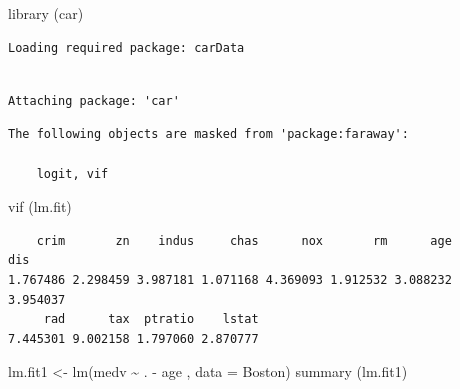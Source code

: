 \documentclass[
  letterpaper,
  DIV=11,
  numbers=noendperiod]{scrartcl}
\newenvironment{Shaded}{\begin{snugshade}}{\end{snugshade}}
\newcommand{\AttributeTok}[1]{\textcolor[rgb]{0.40,0.45,0.13}{#1}}
\newcommand{\FunctionTok}[1]{\textcolor[rgb]{0.28,0.35,0.67}{#1}}
\newcommand{\NormalTok}[1]{\textcolor[rgb]{0.00,0.23,0.31}{#1}}
\newcommand{\OtherTok}[1]{\textcolor[rgb]{0.00,0.23,0.31}{#1}}
\newcommand{\SpecialCharTok}[1]{\textcolor[rgb]{0.37,0.37,0.37}{#1}}
\begin{document}
\begin{Shaded}
\begin{Highlighting}[]
\FunctionTok{library}\NormalTok{ (car)}
\end{Highlighting}
\end{Shaded}

\begin{verbatim}
Loading required package: carData
\end{verbatim}

\begin{verbatim}

Attaching package: 'car'
\end{verbatim}

\begin{verbatim}
The following objects are masked from 'package:faraway':

    logit, vif
\end{verbatim}

\begin{Shaded}
\begin{Highlighting}[]
\FunctionTok{vif}\NormalTok{ (lm.fit)}
\end{Highlighting}
\end{Shaded}

\begin{verbatim}
    crim       zn    indus     chas      nox       rm      age      dis 
1.767486 2.298459 3.987181 1.071168 4.369093 1.912532 3.088232 3.954037 
     rad      tax  ptratio    lstat 
7.445301 9.002158 1.797060 2.870777 
\end{verbatim}

\begin{Shaded}
\begin{Highlighting}[]
\NormalTok{lm.fit1 }\OtherTok{\textless{}{-}} \FunctionTok{lm}\NormalTok{(medv }\SpecialCharTok{\textasciitilde{}}\NormalTok{ . }\SpecialCharTok{{-}}\NormalTok{ age , }\AttributeTok{data =}\NormalTok{ Boston)}
\FunctionTok{summary}\NormalTok{ (lm.fit1)}
\end{Highlighting}
\end{Shaded}
\end{document}
